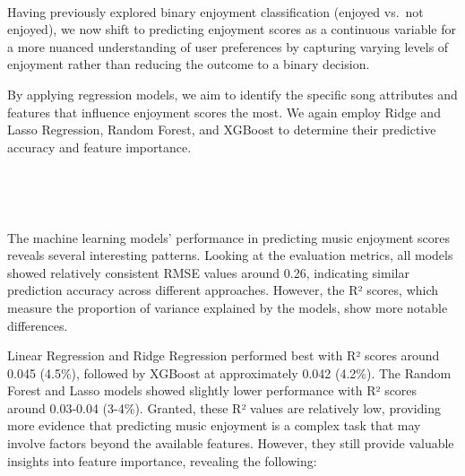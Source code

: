 \documentclass[11pt]{article}
\begin{document}
    \begin{center}
    \end{center}
    { \hspace*{\fill} \\}
    
    Having previously explored binary enjoyment classification (enjoyed
vs.~not enjoyed), we now shift to predicting enjoyment scores as a
continuous variable for a more nuanced understanding of user preferences
by capturing varying levels of enjoyment rather than reducing the
outcome to a binary decision.

By applying regression models, we aim to identify the specific song
attributes and features that influence enjoyment scores the most. We
again employ Ridge and Lasso Regression, Random Forest, and XGBoost to
determine their predictive accuracy and feature importance.

    \begin{center}
    \end{center}
    { \hspace*{\fill} \\}
    
    \begin{center}
    \end{center}
    { \hspace*{\fill} \\}
    
    The machine learning models' performance in predicting music enjoyment
scores reveals several interesting patterns. Looking at the evaluation
metrics, all models showed relatively consistent RMSE values around
0.26, indicating similar prediction accuracy across different
approaches. However, the R² scores, which measure the proportion of
variance explained by the models, show more notable differences.

Linear Regression and Ridge Regression performed best with R² scores
around 0.045 (4.5\%), followed by XGBoost at approximately 0.042
(4.2\%). The Random Forest and Lasso models showed slightly lower
performance with R² scores around 0.03-0.04 (3-4\%). Granted, these R²
values are relatively low, providing more evidence that predicting music
enjoyment is a complex task that may involve factors beyond the
available features. However, they still provide valuable insights into
feature importance, revealing the following:
\end{document}
